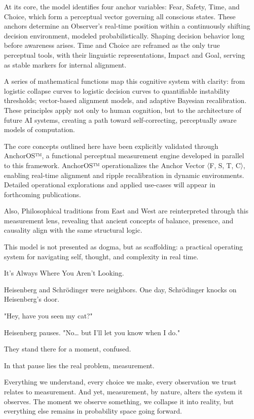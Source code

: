 \documentclass[11pt]{article}
\begin{document}
At its core, the model identifies four anchor variables: Fear, Safety, Time, and Choice, which form a perceptual vector governing all conscious states. These anchors determine an Observer’s real-time position within a continuously shifting decision environment, modeled probabilistically. Shaping decision behavior long before awareness arises. Time and Choice are reframed as the only true perceptual tools, with their linguistic representations, Impact and Goal, serving as stable markers for internal alignment.

A series of mathematical functions map this cognitive system with clarity: from logistic collapse curves to logistic decision curves to quantifiable instability thresholds; vector-based alignment models, and adaptive Bayesian recalibration. These principles apply not only to human cognition, but to the architecture of future AI systems, creating a path toward self-correcting, perceptually aware models of computation.

The core concepts outlined here have been explicitly validated through AnchorOS™, a functional perceptual measurement engine developed in parallel to this framework. AnchorOS™ operationalizes the Anchor Vector 〈F, S, T, C〉, enabling real-time alignment and ripple recalibration in dynamic environments. Detailed operational explorations and applied use-cases will appear in forthcoming publications.

Also, Philosophical traditions from East and West are reinterpreted through this measurement lens, revealing that ancient concepts of balance, presence, and causality align with the same structural logic.

This model is not presented as dogma, but as scaffolding: a practical operating system for navigating self, thought, and complexity in real time.

It’s Always Where You Aren’t Looking.

Heisenberg and Schrödinger were neighbors. One day, Schrödinger knocks on Heisenberg’s door.

"Hey, have you seen my cat?"

Heisenberg pauses. "No… but I’ll let you know when I do."

They stand there for a moment, confused. 

In that pause lies the real problem, measurement. 

Everything we understand, every choice we make, every observation we trust relates to measurement. And yet, measurement, by nature, alters the system it observes. The moment we observe something, we collapse it into reality, but everything else remains in probability space going forward. 
\end{document}
